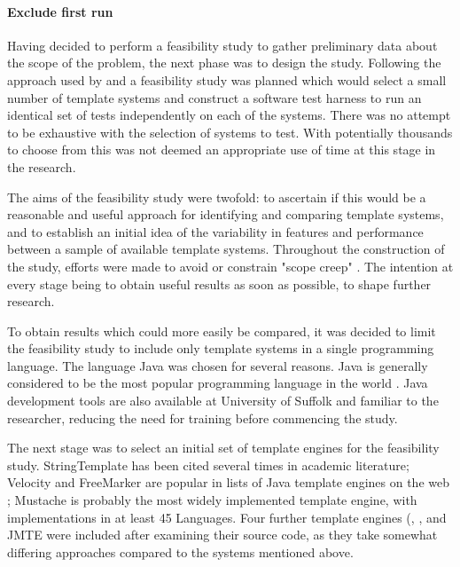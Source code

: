 \paragraph{Exclude first run}

Having decided to perform a feasibility study to gather preliminary data about the scope of the problem, the next phase was to design the study. Following the approach used by \cite{Laakso2008} and \cite{Zoio2005} a feasibility study was planned which would select a small number of template systems and construct a software test harness to run an identical set of tests independently on each of the systems. There was no attempt to be exhaustive with the selection of systems to test. With potentially thousands to choose from this was not deemed an appropriate use of time at this stage in the research.

The aims of the feasibility study were twofold: to ascertain if this would be a reasonable and useful approach for identifying and comparing template systems, and to establish an initial idea of the variability in features and performance between a sample of available template systems. Throughout the construction of the study, efforts were made to avoid or constrain "scope creep" \citep{Heinze2014}. The intention at every stage being to obtain useful results as soon as possible, to shape further research.

To obtain results which could more easily be compared, it was decided to limit the feasibility study to include only template systems in a single programming language. The language Java \citep{Oracle2018Java} was chosen for several reasons. Java is generally considered to be the most popular programming language in the world \citep{Tiobe2018}. Java development tools are also available at University of Suffolk and familiar to the researcher, reducing the need for training before commencing the study.

The next stage was to select an initial set of template engines for the feasibility study. StringTemplate \cite{Parr2004} has been cited several times in academic literature; Velocity \citep{Apache2018Velocity} and FreeMarker \citep{Apache2018FreeMarker} are popular in lists of Java template engines on the web \citep{Dzone2016}; Mustache \citep{Mustache2018} is probably the most widely implemented template engine, with implementations in at least 45 Languages. Four further template engines (\cite{Casper2018}, \cite{Hapax2018}, \cite{Jangod2018} and JMTE \citep{HubSpot2018} were included after examining their source code, as they take somewhat differing approaches compared to the systems mentioned above.

